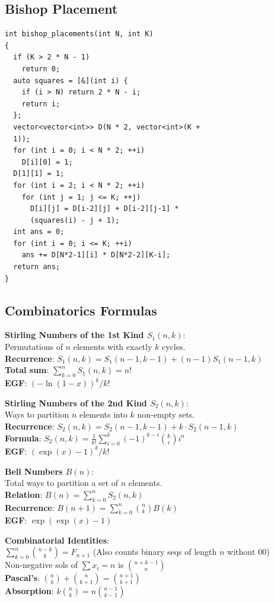 \subsection{Bishop Placement}
\begin{verbatim}
int bishop_placements(int N, int K)
{
  if (K > 2 * N - 1)
    return 0;
  auto squares = [&](int i) {
    if (i > N) return 2 * N - i;
    return i;
  };
  vector<vector<int>> D(N * 2, vector<int>(K +
  1));
  for (int i = 0; i < N * 2; ++i)
    D[i][0] = 1;
  D[1][1] = 1;
  for (int i = 2; i < N * 2; ++i)
    for (int j = 1; j <= K; ++j)
      D[i][j] = D[i-2][j] + D[i-2][j-1] *
      (squares(i) - j + 1);
  int ans = 0;
  for (int i = 0; i <= K; ++i)
    ans += D[N*2-1][i] * D[N*2-2][K-i];
  return ans;
}
\end{verbatim}
\subsection{Combinatorics Formulas}

\textbf{Stirling Numbers of the 1st Kind $S_1(n,k)$}: \\
Permutations of $n$ elements with exactly $k$ cycles. \\
\textbullet{} \textbf{Recurrence}: $S_1(n,k) = S_1(n-1,k-1) + (n-1)S_1(n-1,k)$ \\
\textbullet{} \textbf{Total sum}: $\sum_{k=0}^n S_1(n,k) = n!$ \\
\textbullet{} \textbf{EGF}: $(-\ln(1-x))^k / k!$

\textbf{Stirling Numbers of the 2nd Kind $S_2(n,k)$}: \\
Ways to partition $n$ elements into $k$ non-empty sets. \\
\textbullet{} \textbf{Recurrence}: $S_2(n,k) = S_2(n-1,k-1) + k \cdot S_2(n-1,k)$ \\
\textbullet{} \textbf{Formula}: $S_2(n,k) = \frac{1}{k!} \sum_{i=0}^k (-1)^{k-i} \binom{k}{i} i^n$ \\
\textbullet{} \textbf{EGF}: $(\exp(x)-1)^k / k!$

\textbf{Bell Numbers $B(n)$}: \\
Total ways to partition a set of $n$ elements. \\
\textbullet{} \textbf{Relation}: $B(n) = \sum_{k=0}^n S_2(n,k)$ \\
\textbullet{} \textbf{Recurrence}: $B(n+1) = \sum_{k=0}^n \binom{n}{k} B(k)$ \\
\textbullet{} \textbf{EGF}: $\exp(\exp(x)-1)$

\textbf{Combinatorial Identities}: \\
\textbullet{} $\sum_{k=0}^n \binom{n-k}{k} = F_{n+1}$ (Also counts binary seqs of length $n$ without 00) \\
\textbullet{} Non-negative sols of $\sum x_i = n$ is $\binom{n+k-1}{n}$ \\
\textbullet{} \textbf{Pascal's}: $\binom{n}{k} + \binom{n}{k+1} = \binom{n+1}{k+1}$ \\
\textbullet{} \textbf{Absorption}: $k\binom{n}{k} = n\binom{n-1}{k-1}$

